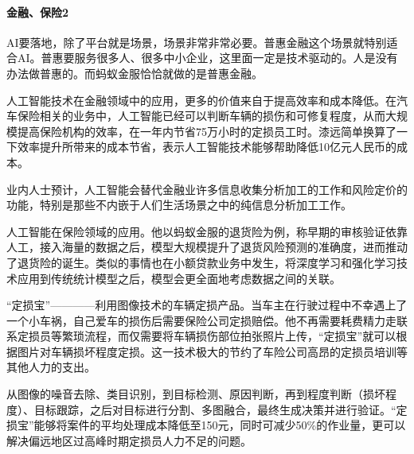 \documentclass[letterpaper,11pt,english]{sphinxmanual}
\begin{document}
\paragraph{金融、保险2\sphinxfootnotemark[819]}
\label{\detokenize{chapter_AI_dive/qi_yuan:id5}}%
\begin{footnotetext}[819]\sphinxAtStartFootnote
{}
%
\end{footnotetext}\ignorespaces 
AI要落地，除了平台就是场景，场景非常非常必要。普惠金融这个场景就特别适合AI。普惠要服务很多人、很多中小企业，这里面一定是技术驱动的。人是没有办法做普惠的。而蚂蚁金服恰恰就做的是普惠金融。

人工智能技术在金融领域中的应用，更多的价值来自于提高效率和成本降低。在汽车保险相关的业务中，人工智能已经可以判断车辆的损伤和可修复程度，从而大规模提高保险机构的效率，在一年内节省75万小时的定损员工时。漆远简单换算了一下效率提升所带来的成本节省，表示人工智能技术能够帮助降低10亿元人民币的成本。

业内人士预计，人工智能会替代金融业许多信息收集分析加工的工作和风险定价的功能，特别是那些不内嵌于人们生活场景之中的纯信息分析加工工作。%
\begin{footnote}[820]\sphinxAtStartFootnote
{}
%
\end{footnote}

人工智能在保险领域的应用。他以蚂蚁金服的退货险为例，称早期的审核验证依靠人工，接入海量的数据之后，模型大规模提升了退货风险预测的准确度，进而推动了退货险的诞生。类似的事情也在小额贷款业务中发生，将深度学习和强化学习技术应用到传统统计模型之后，模型会更全面地考虑数据之间的关联。

“定损宝”————利用图像技术的车辆定损产品。当车主在行驶过程中不幸遇上了一个小车祸，自己爱车的损伤后需要保险公司定损赔偿。他不再需要耗费精力走联系定损员等繁琐流程，而仅需要将车辆损伤部位拍张照片上传，“定损宝”就可以根据图片对车辆损坏程度定损。这一技术极大的节约了车险公司高昂的定损员培训等其他人力的支出。

从图像的噪音去除、类目识别，到目标检测、原因判断，再到程度判断（损坏程度）、目标跟踪，之后对目标进行分割、多图融合，最终生成决策并进行验证。“定损宝”能够将案件的平均处理成本降低至150元，同时可减少50\%的作业量，更可以解决偏远地区过高峰时期定损员人力不足的问题。%
\begin{footnote}[821]\sphinxAtStartFootnote
{}
%
\end{footnote}
\end{document}

